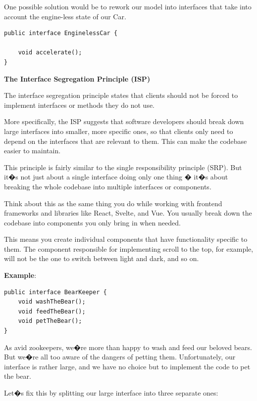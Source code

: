 One possible solution would be to rework our model into interfaces that take into account the engine-less state of our Car.

\begin{lstlisting}
public interface EnginelessCar {

    void accelerate();
}
\end{lstlisting}


\medskip
\begin{center}
\textbf{The Interface Segregation Principle (ISP)}
\end{center}

The interface segregation principle states that clients should not be forced to implement interfaces or methods they do not use.

More specifically, the ISP suggests that software developers should break down large interfaces into smaller, more specific ones, so that clients only need to depend on the interfaces that are relevant to them. This can make the codebase easier to maintain.

This principle is fairly similar to the single responsibility principle (SRP). But it�s not just about a single interface doing only one thing � it�s about breaking the whole codebase into multiple interfaces or components.

Think about this as the same thing you do while working with frontend frameworks and libraries like React, Svelte, and Vue. You usually break down the codebase into components you only bring in when needed.

This means you create individual components that have functionality specific to them. The component responsible for implementing scroll to the top, for example, will not be the one to switch between light and dark, and so on.

\textbf{Example}:

\begin{lstlisting}
public interface BearKeeper {
    void washTheBear();
    void feedTheBear();
    void petTheBear();
}
\end{lstlisting}

As avid zookeepers, we�re more than happy to wash and feed our beloved bears. But we�re all too aware of the dangers of petting them. Unfortunately, our interface is rather large, and we have no choice but to implement the code to pet the bear.

Let�s fix this by splitting our large interface into three separate ones:

